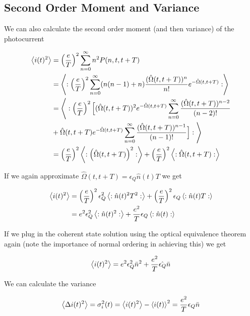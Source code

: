 \documentclass[12pt]{article}
\begin{document}
\subsection{Second Order Moment and Variance}

We can also calculate the second order moment (and then variance) of the photocurrent

\begin{align}
\Braket{i(t)^2} &= \left(\frac{e}{T}\right)^2 \sum_{n=0}^{\infty} n^2 P(n,t,t+T)\\
&=\Braket{:\left(\frac{e}{T}\right)^2 \sum_{n=0}^{\infty} (n(n-1) + n) \frac{(\hat{\Omega}(t,t+T))^n}{n!} e^{-\hat{\Omega}(t,t+T)}:}\\
&= \Bigg \langle:\left(\frac{e}{T}\right)^2 \Big[(\hat{\Omega}(t,t+T))^2 e^{-\hat{\Omega}(t,t+T)} \sum_{n=0}^{\infty} \frac{(\hat{\Omega}(t,t+T))^{n-2}}{(n-2)!}\\
& + \hat{\Omega}(t,t+T) e^{-\hat{\Omega}(t,t+T)} \sum_{n=0}^{\infty} \frac{(\hat{\Omega}(t,t+T))^{n-1}}{(n-1)!}\Big]: \Bigg \rangle\\
&= \left(\frac{e}{T}\right)^2 \Braket{:\left(\hat{\Omega}(t,t+T)\right)^2:} + \left(\frac{e}{T}\right)^2 \Braket{:\hat{\Omega}(t,t+T):}
\end{align}

If we again approximate $\hat{\Omega}(t,t+T) = \epsilon_Q \hat{n}(t) T$ we get

\begin{align}
\Braket{i(t)^2} &= \left( \frac{e}{T} \right)^2 \epsilon_Q^2 \Braket{:\hat{n}(t)^2 T^2 :} + \left(\frac{e}{T}\right)^2 \epsilon_Q \Braket{:\hat{n}(t) T :}\\
&= e^2 \epsilon_Q^2 \Braket{:\hat{n}(t)^2:} + \frac{e^2}{T} \epsilon_Q\Braket{:\hat{n}(t):}
\end{align}

If we plug in the coherent state solution using the optical equivalence theorem again (note the importance of normal ordering in achieving this) we get

\begin{align}
\Braket{i(t)^2} = e^2 \epsilon_Q^2 \bar{n}^2 + \frac{e^2}{T} \hat{\epsilon_Q} \bar{n}
\end{align}

We can calculate the variance

\begin{align}
\Braket{\Delta i(t)^2} = \sigma_i^2(t) = \Braket{i(t)^2} - \Braket{i(t)}^2 = \frac{e^2}{T} \epsilon_Q \bar{n}
\end{align}
\end{document}
